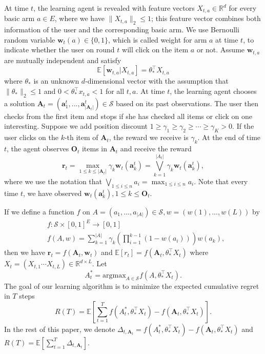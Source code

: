 \documentclass{article}
\newcommand{\bA}{\mathbf{A}}
\newcommand{\ba}{\mathbf{a}}
\newcommand{\bO}{\mathbf{O}}
\newcommand{\br}{\mathbf{r}}
\newcommand{\bw}{\mathbf{w}}
\newcommand{\cS}{\mathcal{S}}
\newcommand{\EE}{\mathbb{E}}
\newcommand{\RR}{\mathbb{R}}
\newcommand{\argmax}{\mathrm{argmax}}
\newcommand{\abs}[1]{\left| #1 \right|}
\newcommand{\norm}[1]{\| #1 \|}
\begin{document}
	At time $t$, the learning agent is revealed with feature vectors $X_{t,a} \in \RR^d$ for every basic arm $a \in E$, where we have $\norm{X_{t,a}}_2 \leq 1$; this feature vector combines both information of the user and the corresponding basic arm. We use Bernoulli random variable $\bw_{t}(a) \in \{0,1\}$, which is called weight for arm $a$ at time $t$, to indicate whether the user on round $t$ will click on the item $a$ or not. Assume $\bw_{t,a}$ are mutually independent and satisfy
	\begin{equation}
	\label{eq:expectation}
	\EE[\bw_{t,a} | X_{t,a}] = \theta_*^{\top} X_{t,a}
	\end{equation}
	where $\theta_*$ is an unknown $d$-dimensional vector with the assumption that $\norm{\theta_*}_2 \leq 1$ and $0 < \theta_*^{\top} x_{t,a} < 1$ for all $t, a$. At time $t$, the learning agent chooses a solution $\bA_t=(\ba_{1}^t,...,\ba_{\abs{\bA_t}}^t) \in \cS$ based on its past observations. The user then checks from the first item and stops if she has checked all items or click on one interesting. Suppose we add position discount $1 \geq\gamma_1 \geq \gamma_2\geq \cdots \geq \gamma_K>0$. If the user clicks on the $k$-th item of $\bA_t$, the reward we receive is $\gamma_k$. At the end of time $t$, the agent observes $\bO_t$ items in $\bA_t$ and receive the reward
	$$
	\br_t = \max_{1 \leq k \leq \abs{\bA_t}} \gamma_k \bw_t(\ba_k^t) = \bigvee_{k=1}^{\abs{A_t}} \gamma_k \bw_t(\ba_k^t),
	$$
	where we use the notation that $\bigvee_{1\leq i\leq n}a_i = \max_{1\leq i\leq n}a_i$. Note that every time $t$, we have observed $\bw_t(\ba_k^t), 1\leq k\leq\bO_t$. 
	
	If we define a function $f$ on $A=(a_1,...,a_{\abs{A}}) \in \cS, w=(w(1),...,w(L))$ by
	\begin{align*}
	& f : \cS \times [0,1]^E \to [0,1]\\
	& f(A,w) = \sum_{k=1}^{\abs{A}}\gamma_k (\prod_{i=1}^{k-1}(1 -w(a_i)))w(a_k),
	\end{align*}
	then we have $\br_t = f(\bA_t, \bw_t)$ and $\EE[r_t]=f(\bA_t,\theta_*^{\top}X_t)$ where $X_t=(X_{t,1} \cdots X_{t,L})\in\RR^{d\times L}$. Let 
	$$
	A_t^* = \argmax_{A\in \cS} f(A,\theta_*^{\top}X_t).
	$$ 
	The goal of our learning algorithm is to minimize the expected cumulative regret in $T$ steps
	$$
	R(T) = \EE[\sum_{t=1}^T f(A_t^*, \theta_*^{\top}X_t) - f(\bA_t, \theta_*^{\top}X_t)].
	$$
	In the rest of this paper, we denote $\Delta_{t,\bA_t} = f(A_t^*, \theta_*^{\top}X_t) - f(\bA_t, \theta_*^{\top}X_t)$ and $R(T) = \EE[\sum_{t=1}^T \Delta_{t,\bA_t}]$.
	
\end{document}
